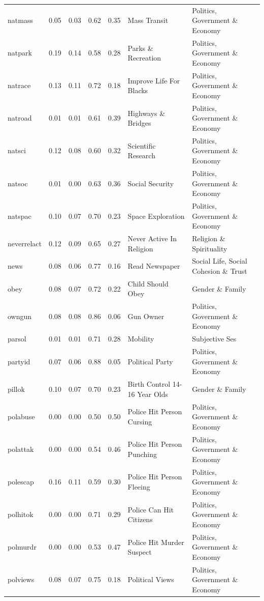 \documentclass[
  12pt,
]{article}
\begin{document}
\begin{landscape}
\begin{scriptsize}
\begin{longtable}{|p{1.75in}|p{0.3in}|p{0.3in}|p{0.3in}|p{0.3in}|p{2.5in}|p{2.5in}}
natmass & 0.05 & 0.03 & 0.62 & 0.35 & Mass Transit & Politics, Government \& Economy \\ 
natpark & 0.19 & 0.14 & 0.58 & 0.28 & Parks \& Recreation & Politics, Government \& Economy \\ 
natrace & 0.13 & 0.11 & 0.72 & 0.18 & Improve Life For Blacks & Politics, Government \& Economy \\ 
natroad & 0.01 & 0.01 & 0.61 & 0.39 & Highways \& Bridges & Politics, Government \& Economy \\ 
natsci & 0.12 & 0.08 & 0.60 & 0.32 & Scientific Research & Politics, Government \& Economy \\ 
natsoc & 0.01 & 0.00 & 0.63 & 0.36 & Social Security & Politics, Government \& Economy \\ 
natspac & 0.10 & 0.07 & 0.70 & 0.23 & Space Exploration & Politics, Government \& Economy \\ 
neverrelact & 0.12 & 0.09 & 0.65 & 0.27 & Never Active In Religion & Religion \& Spirituality \\ 
news & 0.08 & 0.06 & 0.77 & 0.16 & Read Newspaper & Social Life, Social Cohesion \& Trust \\ 
obey & 0.08 & 0.07 & 0.72 & 0.22 & Child Should Obey & Gender \& Family \\ 
owngun & 0.08 & 0.08 & 0.86 & 0.06 & Gun Owner & Politics, Government \& Economy \\ 
parsol & 0.01 & 0.01 & 0.71 & 0.28 & Mobility & Subjective Ses \\ 
partyid & 0.07 & 0.06 & 0.88 & 0.05 & Political Party & Politics, Government \& Economy \\ 
pillok & 0.10 & 0.07 & 0.70 & 0.23 & Birth Control 14-16 Year Olds & Gender \& Family \\ 
polabuse & 0.00 & 0.00 & 0.50 & 0.50 & Police Hit Person Cursing & Politics, Government \& Economy \\ 
polattak & 0.00 & 0.00 & 0.54 & 0.46 & Police Hit Person Punching & Politics, Government \& Economy \\ 
polescap & 0.16 & 0.11 & 0.59 & 0.30 & Police Hit Person Fleeing & Politics, Government \& Economy \\ 
polhitok & 0.00 & 0.00 & 0.71 & 0.29 & Police Can Hit Citizens & Politics, Government \& Economy \\ 
polmurdr & 0.00 & 0.00 & 0.53 & 0.47 & Police Hit Murder Suspect & Politics, Government \& Economy \\ 
polviews & 0.08 & 0.07 & 0.75 & 0.18 & Political Views & Politics, Government \& Economy \\ 

\end{longtable}
\end{scriptsize}
\end{landscape}
\end{document}
